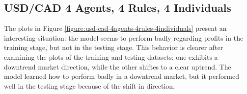 \newpage

\subsection{USD/CAD 4 Agents, 4 Rules, 4 Individuals}
\label{results:forecast-usd-cad-4agents-4rules-4individuals}

The plots in Figure \ref{figure:usd-cad-4agents-4rules-4individuals} present an
interesting situation: the model seems to perform badly regarding profits in the
training stage, but not in the testing stage. This behavior is clearer after
examining the plots of the training and testing datasets: one exhibits a
downtrend market direction, while the other shiftes to a clear uptrend. The
model learned how to perform badly in a downtrend market, but it performed well
in the testing stage because of the shift in direction.

